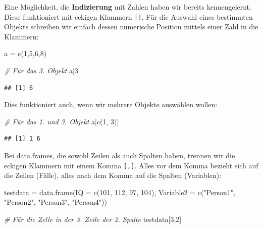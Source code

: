 \documentclass[
]{book}
\newenvironment{Shaded}{\begin{snugshade}}{\end{snugshade}}
\newcommand{\AttributeTok}[1]{\textcolor[rgb]{0.77,0.63,0.00}{#1}}
\newcommand{\CommentTok}[1]{\textcolor[rgb]{0.56,0.35,0.01}{\textit{#1}}}
\newcommand{\DecValTok}[1]{\textcolor[rgb]{0.00,0.00,0.81}{#1}}
\newcommand{\FunctionTok}[1]{\textcolor[rgb]{0.00,0.00,0.00}{#1}}
\newcommand{\NormalTok}[1]{#1}
\newcommand{\OtherTok}[1]{\textcolor[rgb]{0.56,0.35,0.01}{#1}}
\newcommand{\StringTok}[1]{\textcolor[rgb]{0.31,0.60,0.02}{#1}}
\begin{document}
Eine Möglichkeit, die \textbf{Indizierung} mit Zahlen haben wir bereits kennengelernt. Diese funktioniert mit eckigen Klammern \texttt{{[}{]}}. Für die Auswahl eines bestimmten Objekts schreiben wir einfach dessen numerische Position mittels einer Zahl in die Klammern:

\begin{Shaded}
\begin{Highlighting}[]
\NormalTok{a }\OtherTok{=} \FunctionTok{c}\NormalTok{(}\DecValTok{1}\NormalTok{,}\DecValTok{5}\NormalTok{,}\DecValTok{6}\NormalTok{,}\DecValTok{8}\NormalTok{)}

\CommentTok{\# Für das 3. Objekt}
\NormalTok{a[}\DecValTok{3}\NormalTok{]}
\end{Highlighting}
\end{Shaded}

\begin{verbatim}
## [1] 6
\end{verbatim}

Dies funktioniert auch, wenn wir mehrere Objekte auswählen wollen:

\begin{Shaded}
\begin{Highlighting}[]
\CommentTok{\# Für das 1. und 3. Objekt}
\NormalTok{a[}\FunctionTok{c}\NormalTok{(}\DecValTok{1}\NormalTok{, }\DecValTok{3}\NormalTok{)]}
\end{Highlighting}
\end{Shaded}

\begin{verbatim}
## [1] 1 6
\end{verbatim}

Bei data.frames, die sowohl Zeilen als auch Spalten haben, trennen wir die eckigen Klammern mit einem Komma \texttt{{[},{]}}. Alles vor dem Komma bezieht sich auf die Zeilen (Fälle), alles nach dem Komma auf die Spalten (Variablen):

\begin{Shaded}
\begin{Highlighting}[]
\NormalTok{testdata }\OtherTok{=} \FunctionTok{data.frame}\NormalTok{(}\AttributeTok{IQ =} \FunctionTok{c}\NormalTok{(}\DecValTok{101}\NormalTok{, }\DecValTok{112}\NormalTok{, }\DecValTok{97}\NormalTok{, }\DecValTok{104}\NormalTok{),}
                     \AttributeTok{Variable2 =} \FunctionTok{c}\NormalTok{(}\StringTok{"Person1"}\NormalTok{, }\StringTok{"Person2"}\NormalTok{, }\StringTok{"Person3"}\NormalTok{, }\StringTok{"Person4"}\NormalTok{))}

\CommentTok{\# Für die Zelle in der 3. Zeile der 2. Spalte}
\NormalTok{testdata[}\DecValTok{3}\NormalTok{,}\DecValTok{2}\NormalTok{]}
\end{Highlighting}
\end{Shaded}
\end{document}

